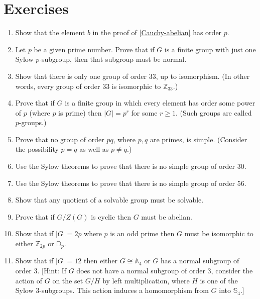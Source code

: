\documentclass[11pt,oneside]{article}
\newenvironment{problems}
{
 \begin{enumerate}[topsep=1pt,itemsep=0pt,parsep=2pt,leftmargin=0.6cm,%
 label={\arabic*.}, ref=\arabic*] \small
}
{
 \end{enumerate}
}
\theoremstyle{definition}
\newcommand{\Z}{\mathbb{Z}} %
\newcommand{\Sym}{\mathbb{S}}
\newcommand{\Alt}{\mathbb{A}}
\newcommand{\D}{\mathbb{D}}
\begin{document}
\section*{Exercises}
\begin{problems}

\item Show that the element $b$ in the proof of \ref{Cauchy-abelian}
has order $p$.

\item Let $p$ be a given prime number. Prove that if $G$ is a finite
group with just one Sylow $p$-subgroup, then that subgroup must be
normal.

\item Show that there is only one group of order $33$, up to
  isomorphism. (In other words, every group of order 33 is isomorphic
  to $\Z_{33}$.)

\item{}\label{exer:p-gp} Prove that if $G$ is a
  finite group in which every element has order some power of $p$
  (where $p$ is prime) then $|G| = p^r$ for some $r \ge 1$. (Such
  groups are called $p$-groups.)

\item Prove that no group of order $pq$, where $p,q$ are primes, is
  simple. (Consider the possibility $p=q$ as well as $p\ne q$.)

\item Use the Sylow theorems to prove that there is no simple group
of order $30$.

\item Use the Sylow theorems to prove that there is no simple group
of order $56$.

\item Show that any quotient of a solvable group must be solvable.


\item Prove that if $G/Z(G)$ is cyclic then $G$ must be abelian.

\item Show that if $|G| = 2p$ where $p$ is an odd prime then $G$ must
  be isomorphic to either $\Z_{2p}$ or $\D_{p}$.

\item Show that if $|G| = 12$ then either $G \cong \Alt_4$ or $G$ has
  a normal subgroup of order $3$. [Hint: If $G$ does not have a normal
    subgroup of order 3, consider the action of $G$ on the set $G/H$
    by left multiplication, where $H$ is one of the Sylow
    3-subgroups. This action induces a homomorphism from $G$ into
    $\Sym_4$.]
\end{problems}
\end{document}
